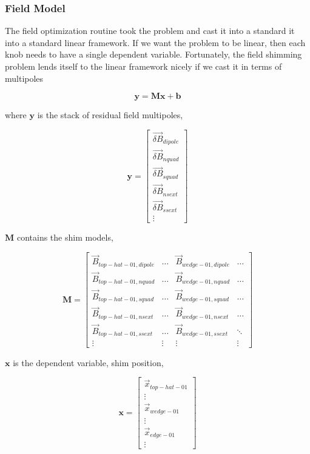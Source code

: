 
\subsubsection{Field Model}

The field optimization routine took the problem and cast it into a standard it into a standard linear framework.  If we want the problem to be linear, then each knob needs to have a single dependent variable.  Fortunately, the field shimming problem lends itself to the linear framework nicely if we cast it in terms of multipoles

\[
\mathbf{y} = \mathbf{M} \mathbf{x} + \mathbf{b}
\]

where $\mathbf{y}$ is the stack of residual field multipoles, 

\[
\mathbf{y} = \begin{bmatrix}
\vec{\delta B}_{dipole} \\
\vec{\delta B}_{nquad} \\
\vec{\delta B}_{squad} \\
\vec{\delta B}_{nsext} \\ 
\vec{\delta B}_{ssext} \\
\vdots
\end{bmatrix}
\]

$\mathbf{M}$ contains the shim models, 

\[
\mathbf{M} = \begin{bmatrix}
\vec{B}_{top-hat-01,dipole} & \hdots & \vec{B}_{wedge-01,dipole} & \hdots \\
\vec{B}_{top-hat-01,nquad}  & \hdots & \vec{B}_{wedge-01,nquad} & \hdots \\
\vec{B}_{top-hat-01,squad}  & \hdots & \vec{B}_{wedge-01,squad} & \hdots \\
\vec{B}_{top-hat-01,nsext}  & \hdots & \vec{B}_{wedge-01,nsext} & \hdots \\ 
\vec{B}_{top-hat-01,ssext}  & \hdots & \vec{B}_{wedge-01,ssext} & \ddots \\
\vdots & \vdots & \vdots & \vdots
\end{bmatrix}
\]

$\mathbf{x}$ is the dependent variable, shim position, 

\[
\mathbf{x} = \begin{bmatrix}
\vec{x}_{top-hat-01} \\
\vdots \\
\vec{x}_{wedge-01} \\
\vdots \\
\vec{x}_{edge-01} \\
\vdots
\end{bmatrix}
\]

